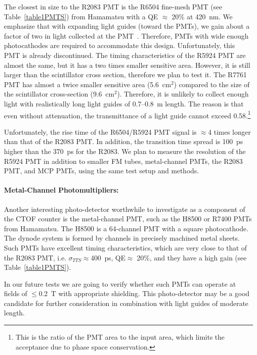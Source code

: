 The closest in size to the R2083 PMT is the R6504 fine-mesh PMT (see
Table~\ref{table1PMTS}) from Hamamatsu with a QE $\approx$ 20\% at 420~nm.  
We emphasize that with expanding light guides (toward the PMTs), we gain 
about a factor of two in light collected at the PMT~\cite{llg}.  Therefore, 
PMTs with wide enough photocathodes are required to accommodate this design.  
Unfortunately, this PMT is already discontinued.  The timing characteristics 
of the R5924 PMT are almost the same, but it has a two times smaller sensitive 
area.  However, it is still larger than the scintillator cross section, therefore 
we plan to test it.  The R7761 PMT has almost a twice smaller sensitive area
(5.6~cm$^2$) compared to the size of the scintillator cross-section (9.6~cm$^2$). 
Therefore, it is  unlikely to collect enough light with realistically long light 
guides of 0.7--0.8~m length.  The reason is that even without attenuation, the 
transmittance of a light guide cannot exceed 0.58.\footnote{This is the ratio of 
the PMT area to the input area, which limits the acceptance due to phase space 
conservation.}

Unfortunately, the rise time of the R6504/R5924 PMT signal is $\approx$4 
times longer than that of the R2083 PMT.  In addition, the transition time 
spread is 100~ps higher than the 370~ps for the R2083.  We plan to measure 
the resolution of the R5924 PMT in addition to smaller FM tubes, metal-channel 
PMTs, the R2083 PMT, and MCP PMTs, using the same test setup and methods.

\paragraph{Metal-Channel Photomultipliers:}

Another interesting photo-detector worthwhile to investigate as a 
component of the CTOF counter is the metal-channel PMT, such as the
H8500 or R7400 PMTs from Hamamatsu.  The H8500 is a 64-channel PMT with a 
square photocathode.  The dynode system is formed by channels in  
precisely machined metal sheets.  Such PMTs have excellent timing 
characteristics, which are very close to that of the R2083 PMT, i.e. 
$\sigma_{TTS} \approx$400~ps, QE$\approx$ 20\%, and they have a high gain 
(see Table~\ref{table1PMTS}).

In our future tests we are going to verify whether such PMTs can operate at 
fields of $\leq$0.2~T with appropriate shielding.  This photo-detector may 
be a good candidate for further consideration in combination with light guides 
of moderate length.  

